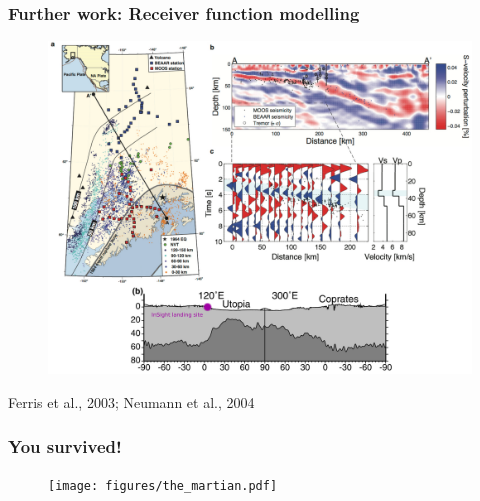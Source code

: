 \documentclass[compress,framenumber]{beamer}
\begin{document}
\begin{frame}
  \frametitle{Further work: Receiver function modelling}
  \vspace{-2.0em}
  \begin{figure}
    \includegraphics[width=0.65\linewidth]{figures/r_fn.pdf}
  \end{figure}
  \hfill Ferris et al., 2003; Neumann et al., 2004 
\end{frame}

\begin{frame}
  \frametitle{You survived!}
  \vspace{-2.0em}
  \begin{figure}
    \texttt{[image: figures/the\_martian.pdf]} 
  \end{figure}
\end{frame}
\end{document}
